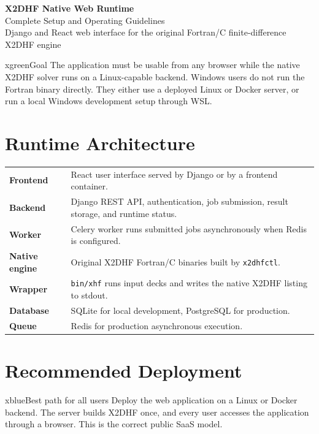 \documentclass[11pt,a4paper]{article}
\begin{document}
\begin{center}
{\Huge\bfseries\color{xnavy} X2DHF Native Web Runtime}\\[3mm]
{\Large\color{xblue} Complete Setup and Operating Guidelines}\\[2mm]
{\color{xnavy} Django and React web interface for the original Fortran/C finite-difference X2DHF engine}
\end{center}

\vspace{3mm}

\begin{xbox}{xgreen}{Goal}
The application must be usable from any browser while the native X2DHF solver runs on a Linux-capable backend. Windows users do not run the Fortran binary directly. They either use a deployed Linux or Docker server, or run a local Windows development setup through WSL.
\end{xbox}

\section{Runtime Architecture}

\begin{tabularx}{\textwidth}{>{\bfseries}p{3.5cm}X}
Frontend & React user interface served by Django or by a frontend container. \\
Backend & Django REST API, authentication, job submission, result storage, and runtime status. \\
Worker & Celery worker runs submitted jobs asynchronously when Redis is configured. \\
Native engine & Original X2DHF Fortran/C binaries built by \texttt{x2dhfctl}. \\
Wrapper & \texttt{bin/xhf} runs input decks and writes the native X2DHF listing to stdout. \\
Database & SQLite for local development, PostgreSQL for production. \\
Queue & Redis for production asynchronous execution. \\
\end{tabularx}

\section{Recommended Deployment}

\begin{xbox}{xblue}{Best path for all users}
Deploy the web application on a Linux or Docker backend. The server builds X2DHF once, and every user accesses the application through a browser. This is the correct public SaaS model.
\end{xbox}
\end{document}
